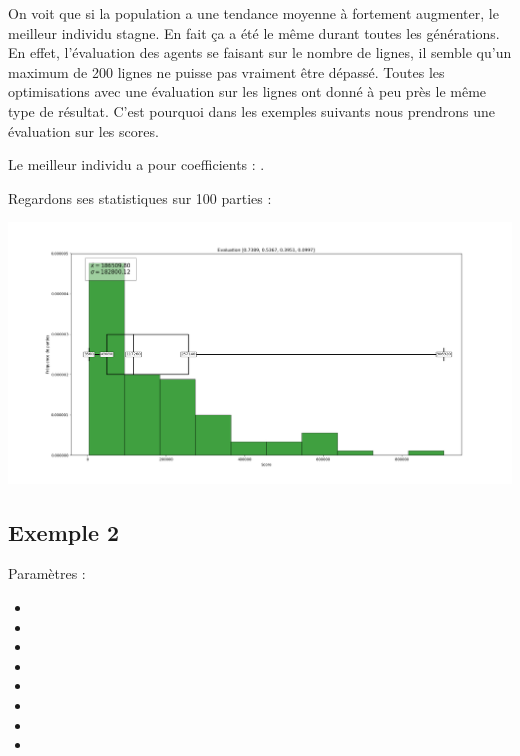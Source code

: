 On voit que si la population a une tendance moyenne à fortement augmenter, le meilleur individu stagne. En fait ça a été le même durant toutes les générations.\\
En effet, l'évaluation des agents se faisant sur le nombre de lignes, il semble qu'un maximum de 200 lignes ne puisse pas vraiment être dépassé. Toutes les optimisations avec une évaluation sur les lignes ont donné à peu près le même type de résultat. C'est pourquoi dans les exemples suivants nous prendrons une évaluation sur les scores.

\medskip

Le meilleur individu a pour coefficients : \pyth{[0.7389, 0.5367, 0.3951, 0.0997]}.
\newpage

Regardons ses statistiques sur 100 parties :

\includegraphics[scale=0.35]{media/results/Stats_Eval_0,7389_0,5367_0,3951_0,0997.png}

\newpage

\subsection{Exemple 2}

Paramètres :
\begin{itemize}
	\item {}
	\item {}
	\item {}
	\item {}
	\item {}
	\item {}
	\item {}
	\item {}
\end{itemize} 

